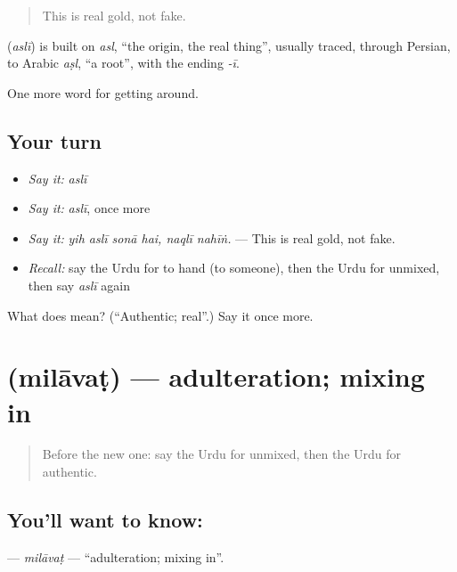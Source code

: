 \begin{quote}
This is real gold, not fake.
\end{quote}

\begin{cousinweb}
\textbf{} (\emph{aslī}) is built on \emph{asl}, \textquotedblleft{}the origin, the real thing\textquotedblright{}, usually traced, through Persian, to Arabic \emph{aṣl}, \textquotedblleft{}a root\textquotedblright{}, with the ending \emph{-ī}.
\end{cousinweb}

\begin{grammarlens}[title={What you've built}]
One more word for getting around.
\end{grammarlens}

\subsection*{Your turn}
\begin{itemize}
\raggedright
  \item \emph{Say it:} \emph{aslī}
  \item \emph{Say it:} \emph{aslī}, once more
  \item \emph{Say it:} \emph{yih aslī sonā hai, naqlī nahīṅ.} — This is real gold, not fake.
  \item \emph{Recall:} say the Urdu for to hand (to someone), then the Urdu for unmixed, then say \emph{aslī} again
\end{itemize}

\begin{tcolorbox}[breakable,colback=teal!4,colframe=teal!35!black,title={Before you move on}]
What does  mean? (\textquotedblleft{}Authentic; real\textquotedblright{}.) Say it once more.
\end{tcolorbox}
\section[\texorpdfstring{\ur{ملاوٹ} (milāvaṭ)}{ملاوٹ (milāvaṭ)}]{ (milāvaṭ) — adulteration; mixing in}

\label{lesson:UR-C426-milavat}



\begin{quote}
Before the new one: say the Urdu for unmixed, then the Urdu for authentic.
\end{quote}

\subsection*{You'll want to know: }
\textbf{} — \emph{milāvaṭ} — \textquotedblleft{}adulteration; mixing in\textquotedblright{}.

